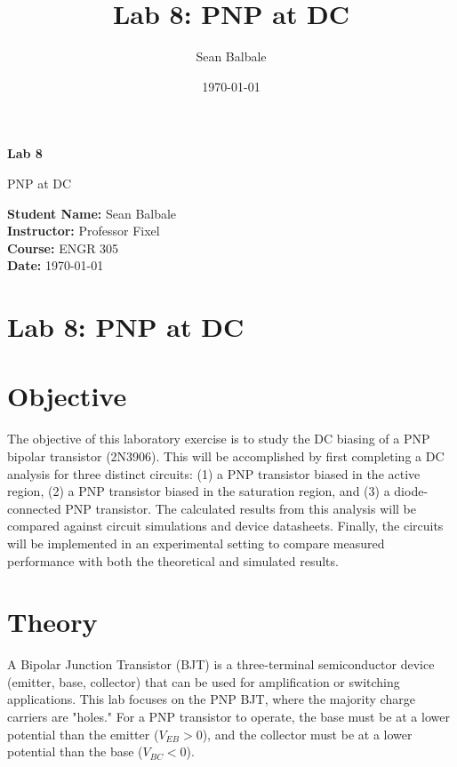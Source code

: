 \documentclass[12pt]{article}
\title{Lab 8: PNP at DC}
\author{Sean Balbale}
\date{\today} %
\begin{document}
\begin{titlepage}
  \begin{center}
    \vspace*{1in}

    \Huge
    \textbf{Lab 8}

    \LARGE
    \vspace{0.5cm}
    PNP at DC

    \vspace{3in}

    \textbf{Student Name:} Sean Balbale
    \\ \textbf{Instructor:} Professor Fixel
    \\ \textbf{Course:} ENGR 305
    \\ \textbf{Date:} \today

    \vfill
  \end{center}
\end{titlepage}

\newpage

\section*{Lab 8: PNP at DC}

\section{Objective}
The objective of this laboratory exercise is to study the DC biasing of a PNP bipolar transistor (2N3906). This will be accomplished by first completing a DC analysis for three distinct circuits: (1) a PNP transistor biased in the active region, (2) a PNP transistor biased in the saturation region, and (3) a diode-connected PNP transistor. The calculated results from this analysis will be compared against circuit simulations and device datasheets. Finally, the circuits will be implemented in an experimental setting to compare measured performance with both the theoretical and simulated results.

\section{Theory}
A Bipolar Junction Transistor (BJT) is a three-terminal semiconductor device (emitter, base, collector) that can be used for amplification or switching applications. This lab focuses on the PNP BJT, where the majority charge carriers are "holes." For a PNP transistor to operate, the base must be at a lower potential than the emitter ($V_{EB} > 0$), and the collector must be at a lower potential than the base ($V_{BC} < 0$).
\end{document}
